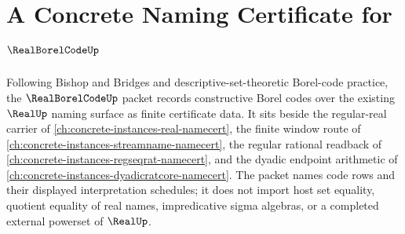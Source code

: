 \chapter{A Concrete Naming Certificate for $\RealBorelCodeUp$}
\label{ch:concrete-instances-real-borel-code-namecert}

Following Bishop and Bridges and descriptive-set-theoretic Borel-code practice, the $\RealBorelCodeUp$ packet records constructive Borel codes over the existing $\RealUp$ naming surface as finite certificate data. It sits beside the regular-real carrier of \autoref{ch:concrete-instances-real-namecert}, the finite window route of \autoref{ch:concrete-instances-streamname-namecert}, the regular rational readback of \autoref{ch:concrete-instances-regseqrat-namecert}, and the dyadic endpoint arithmetic of \autoref{ch:concrete-instances-dyadicratcore-namecert}. The packet names code rows and their displayed interpretation schedules; it does not import host set equality, quotient equality of real names, impredicative sigma algebras, or a completed external powerset of $\RealUp$.

